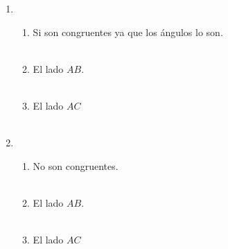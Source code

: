 \begin{enumerate}[\bfseries 1.]
\item 
\begin{enumerate}[\bfseries a)]
    
    \item Si son congruentes ya que los ángulos lo son.\\\\ 

    \item El lado $AB$.\\\\

    \item El lado $AC$\\\\

\end{enumerate}

\item 
\begin{enumerate}[\bfseries a)]
    
    \item No son congruentes.\\\\

    \item El lado $AB$.\\\\

    \item El lado $AC$\\\\

\end{enumerate}




\end{enumerate}


